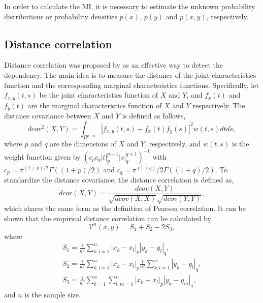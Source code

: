 \documentclass{bioinfo}
\begin{document}
In order to calculate the MI, it is necessary to estimate the unknown probability distributions or probability densities $p(x)$, $p(y)$ and $p(x,y)$, respectively.

\subsection{Distance correlation}
Distance correlation was proposed by \cite{szekely2007measuring} as an effective way to detect the dependency. The main
idea is to measure the distance of the joint characteristics function
and the corresponding marginal characteristics functions. Specifically,
let $f_{x,y}(t,s)$ be the joint characteristics function of $X$
and $Y$, and $f_x(t)$ and $f_y(t)$ are the marginal characteristics
function of $X$ and $Y$ respectively.  The distance
covariance between $X$ and $Y$ is defined as follows,
$$dcov^2(X,Y)=\int_{R^{p+q}}|f_{x,y}(t,s)-f_x(t)f_y(s)|^2
w(t,s)dtds,$$ where $p$ and $q$ are the dimensions of $X$ and $Y$,
respectively, and $w(t,s)$ is the weight function given by $(c_p c_q
|t|_p^{p+1}|s|_q^{q+1})^{-1}$ with
$c_p=\pi^{(1+p)/2}\Gamma((1+p)/2)$ and
$c_q=\pi^{(1+q)}/2\Gamma((1+q)/2)$. To standardize the distance
covariance, the distance correlation is defined as,
$$dcor(X,Y)=\frac{dcov(X,Y)}{\sqrt{dcov(X,X)}\sqrt{dcov(Y,Y)}},$$
which shares the same form as the definition of Pearson correlation. It can be shown that the
empirical distance correlation can be calculated by
$$\mathcal{V}^n(x,y)=S_1+S_2-2S_3,$$
where
\begin{align*}
S_1=\frac{1}{n^2}\sum_{k,l=1}^{n}|x_k-x_l|_p|y_k-y_l|_q,\\
S_2=\frac{1}{n^2}\sum_{k,l=1}^{n}|x_k-x_l|_p\frac{1}{n^2}\sum_{k,l=1}^n|y_k-y_l|_q,\\
S_3=\frac{1}{n^3}\sum_{k=1}^{n}\sum_{l,m=1}^n|x_k-x_l|_p|y_k-y_m|_q,
\end{align*}
and $n$ is the sample size.
\end{document}
